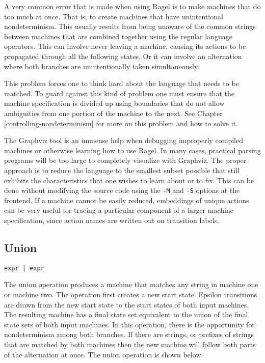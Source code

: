 \documentclass[letterpaper,11pt,oneside]{book}
\newcommand{\verbspace}{\vspace{10pt}}
\begin{document}
A very common error that is made when using Ragel is to make machines that do
too much at once. That is, to create machines that have unintentional
nondeterminism. This usually results from being unaware of the common strings
between machines that are combined together using the regular language
operators. This can involve never leaving a machine, causing its actions to be
propagated through all the following states. Or it can involve an alternation
where both branches are unintentionally taken simultaneously.

This problem forces one to think hard about the language that needs to be
matched. To guard against this kind of problem one must ensure that the machine
specification is divided up using boundaries that do not allow ambiguities from
one portion of the machine to the next. See Chapter
\ref{controlling-nondeterminism} for more on this problem and how to solve it.

The Graphviz tool is an immense help when debugging improperly compiled
machines or otherwise learning how to use Ragel. In many cases, practical
parsing programs will be too large to completely visualize with Graphviz.  The
proper approach is to reduce the language to the smallest subset possible that
still exhibits the characteristics that one wishes to learn about or to fix.
This can be done without modifying the source code using the \verb|-M| and
\verb|-S| options at the frontend. If a machine cannot be easily reduced,
embeddings of unique actions can be very useful for tracing a
particular component of a larger machine specification, since action names are
written out on transition labels.

\subsection{Union}

\verb/expr | expr/
\verbspace

The union operation produces a machine that matches any string in machine one
or machine two. The operation first creates a new start state. Epsilon
transitions are drawn from the new start state to the start states of both
input machines.  The resulting machine has a final state set equivalent to the
union of the final state sets of both input machines. In this operation, there
is the opportunity for nondeterminism among both branches. If there are
strings, or prefixes of strings that are matched by both machines then the new
machine will follow both parts of the alternation at once. The union operation is
shown below.
\end{document}
